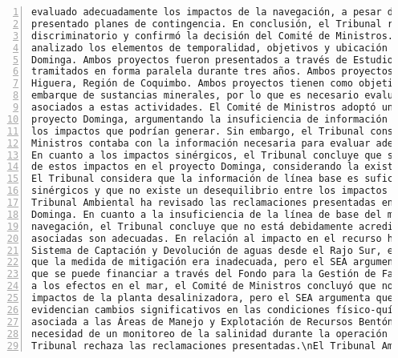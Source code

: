 \begin{Verbatim}[frame=lines, label=Elavoración propia -  Ejemplo de Contexto enviado por el Chatbot a OpenAI
				, fontsize=\footnotesize, numbers=left
				, baselinestretch=0.4
				, formatcom=\color{gray}]
evaluado adecuadamente los impactos de la navegación, a pesar de haber identificado riesgos y
presentado planes de contingencia. En conclusión, el Tribunal rechazó la alegación de trato
discriminatorio y confirmó la decisión del Comité de Ministros.\nEl Tribunal Ambiental ha
analizado los elementos de temporalidad, objetivos y ubicación de los proyectos Cruz Grande y
Dominga. Ambos proyectos fueron presentados a través de Estudios de Impacto Ambiental y fueron
tramitados en forma paralela durante tres años. Ambos proyectos se ubican en la comuna de La
Higuera, Región de Coquimbo. Ambos proyectos tienen como objetivo la recepción, acopio y
embarque de sustancias minerales, por lo que es necesario evaluar los impactos ambientales
asociados a estas actividades. El Comité de Ministros adoptó un actuar distinto respecto al
proyecto Dominga, argumentando la insuficiencia de información sobre las rutas de navegación y
los impactos que podrían generar. Sin embargo, el Tribunal considera que el Comité de
Ministros contaba con la información necesaria para evaluar adecuadamente el proyecto Dominga.
En cuanto a los impactos sinérgicos, el Tribunal concluye que se realizó un análisis completo
de estos impactos en el proyecto Dominga, considerando la existencia del proyecto Cruz Grande.
El Tribunal considera que la información de línea base es suficiente para definir los impactos
sinérgicos y que no existe un desequilibrio entre los impactos y las medidas propuestas.\nEl
Tribunal Ambiental ha revisado las reclamaciones presentadas en relación al proyecto minero
Dominga. En cuanto a la insuficiencia de la línea de base del medio marino en las rutas de
navegación, el Tribunal concluye que no está debidamente acreditada y que las medidas
asociadas son adecuadas. En relación al impacto en el recurso hídrico por el cierre del
Sistema de Captación y Devolución de aguas desde el Rajo Sur, el Comité de Ministros consideró
que la medida de mitigación era inadecuada, pero el SEA argumenta que la medida es idónea y
que se puede financiar a través del Fondo para la Gestión de Faenas Mineras Cerradas. Respecto
a los efectos en el mar, el Comité de Ministros concluyó que no se evaluaron adecuadamente los
impactos de la planta desalinizadora, pero el SEA argumenta que sí se evaluaron y que no se
evidencian cambios significativos en las condiciones físico-químicas ni en la biodiversidad
asociada a las Áreas de Manejo y Explotación de Recursos Bentónicos. Además, se establece la
necesidad de un monitoreo de la salinidad durante la operación del proyecto. En conclusión, el
Tribunal rechaza las reclamaciones presentadas.\nEl Tribunal Ambiental concluye que las

\end{Verbatim}
